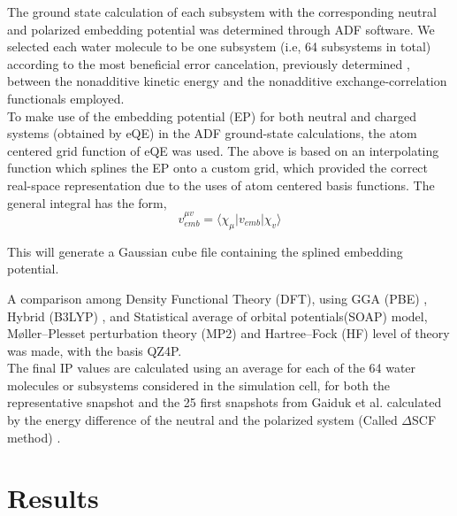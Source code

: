 \documentclass[12pt,a4paper]{article}
\begin{document}
The ground state calculation of each subsystem with the corresponding neutral and polarized embedding potential was determined through ADF
\cite{te2001chemistry} software. We selected each water molecule to be one subsystem (i.e, 64 subsystems in total) according to the most beneficial
error cancelation, previously determined
\cite{genova2016avoiding, kevorkyants2013calculating, pavanello2011modelling, ramos2016critical, solovyeva2012spin},
between the nonadditive kinetic energy and the nonadditive exchange-correlation functionals employed. \\

To make use of the embedding potential (EP) for both neutral and charged systems (obtained by eQE) in the ADF ground-state
calculations, the atom centered grid function of eQE was used. The above is based on an interpolating function which 
splines the EP onto a custom grid, which provided the correct real-space representation due to the uses of atom centered
basis functions. The general integral has the form, \\

\begin{equation}
	v_{emb}^{\mu v} = \langle \chi_{\mu}|v_{emb}|\chi_{v}\rangle 
\end{equation}

This will generate a Gaussian cube file containing the splined embedding potential\cite{genova2017eqe}.

A comparison among Density Functional Theory (DFT), using GGA (PBE) \cite{perdew1996phys}, Hybrid (B3LYP) \cite{hertwig1997parameterization}, 
and Statistical average of orbital potentials(SOAP) model\cite{schipper2000molecular, gritsenko1999approximation}, 
Møller–Plesset perturbation theory (MP2) \cite{head1988mp2} and Hartree–Fock (HF) \cite{marshall1961unrestricted} level of theory was made, with the basis QZ4P. \\ 

The final IP values are calculated using an average for each of the 64 water molecules or subsystems considered in the simulation cell, 
for both the representative snapshot and the 25 first snapshots from Gaiduk et al. calculated by the energy difference of the neutral
and the polarized system (Called $\Delta$SCF method) \cite{bagus1965self,waskom2017mwaskom}.

\section{Results}
\end{document}
